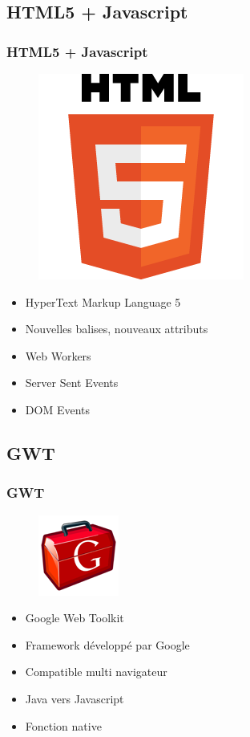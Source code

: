   \subsection*{HTML5 + Javascript}
    \begin{frame}
      \frametitle{HTML5 + Javascript}
	  \begin{figure}
		\center
		\includegraphics[scale=0.20]{html5}
	  \end{figure}
      \begin{itemize}
        \item HyperText Markup Language 5
        \item Nouvelles balises, nouveaux attributs
        \item<2->Web Workers
        \item<3->Server Sent Events
        \item<4->DOM Events
      \end{itemize}
    \end{frame}

  \subsection*{GWT}
    \begin{frame}
      \frametitle{GWT}
      \begin{figure}
		\center
		\includegraphics[scale=0.60]{gwt-logo}
	  \end{figure}
      \begin{itemize}
        \item Google Web Toolkit
        \item Framework développé par Google
        \item<2->Compatible multi navigateur
        \item<3-> Java vers Javascript
        \item<4->Fonction native 
      \end{itemize}
    \end{frame}

